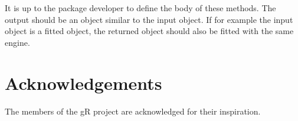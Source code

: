 \documentclass{article}
\begin{document}
It is up to the package developer to define the body of these methods.
The output should be an object similar to the input object. If for
example the input object is a fitted object, the returned object
should also be fitted with the same engine.



\section*{Acknowledgements}

The members of the gR project are acknowledged for their inspiration.


\end{document}
